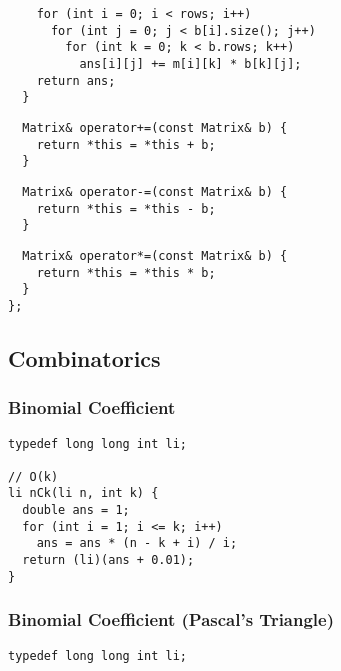 \documentclass[twoside]{article}
\begin{document}
\begin{multicols*}{2}
\begin{verbatim}
    for (int i = 0; i < rows; i++)
      for (int j = 0; j < b[i].size(); j++)
        for (int k = 0; k < b.rows; k++)
          ans[i][j] += m[i][k] * b[k][j];
    return ans;
  }
\end{verbatim}
\vspace{-12pt}
\begin{verbatim}
  Matrix& operator+=(const Matrix& b) {
    return *this = *this + b;
  }
\end{verbatim}
\vspace{-12pt}
\begin{verbatim}
  Matrix& operator-=(const Matrix& b) {
    return *this = *this - b;
  }
\end{verbatim}
\vspace{-12pt}
\begin{verbatim}
  Matrix& operator*=(const Matrix& b) {
    return *this = *this * b;
  }
};
\end{verbatim}

\subsectionfont{\bfseries\sffamily\centering\LARGE}
\vspace{0em}
\subsection*{Combinatorics}
\vspace{2em}
\subsubsectionfont{\large\bfseries\sffamily\underline}
\subsubsection*{Binomial Coefficient}
\begin{verbatim}
typedef long long int li;

// O(k)
li nCk(li n, int k) {
  double ans = 1;
  for (int i = 1; i <= k; i++)
    ans = ans * (n - k + i) / i;
  return (li)(ans + 0.01);
}
\end{verbatim}

\subsubsectionfont{\large\bfseries\sffamily\underline}
\subsubsection*{Binomial Coefficient (Pascal's Triangle)}
\begin{verbatim}
typedef long long int li;


\end{verbatim}
\end{multicols*}
\end{document}
